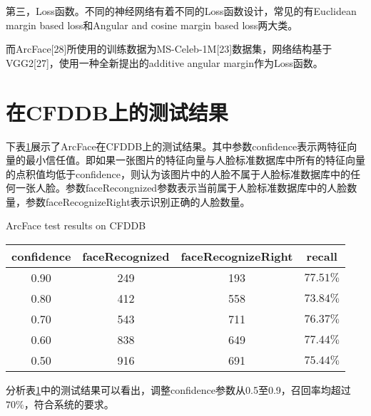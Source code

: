 第三，Loss函数。不同的神经网络有着不同的Loss函数设计，常见的有Euclidean margin based loss和Angular and cosine margin based loss两大类。

而ArcFace[28]所使用的训练数据为MS-Celeb-1M[23]数据集，网络结构基于VGG2[27]，使用一种全新提出的additive angular margin作为Loss函数。

\section{在CFDDB上的测试结果}

下表\ref{tab:arcface}展示了ArcFace在CFDDB上的测试结果。其中参数confidence表示两特征向量的最小信任值。即如果一张图片的特征向量与人脸标准数据库中所有的特征向量的点积值均低于confidence，则认为该图片中的人脸不属于人脸标准数据库中的任何一张人脸。参数faceRecongnized参数表示当前属于人脸标准数据库中的人脸数量，参数faceRecognizeRight表示识别正确的人脸数量。

\begin{table}[!hpb]
	\centering
	{ArcFace test results on CFDDB}
	\label{tab:arcface}
	\begin{tabular}{ ccc | c }
		\hline
		confidence & faceRecognized & faceRecognizeRight &  recall\\
		\hline
		0.90 & 249 & 193 & $77.51\%$\\
		0.80 & 412 & 558 & $73.84\%$\\
		0.70 & 543 & 711 & $76.37\%$\\
		0.60 & 838 & 649 & $77.44\%$\\
		0.50 & 916 & 691 & $75.44\%$\\
		\hline
	\end{tabular}
\end{table}

分析表\ref{tab:arcface}中的测试结果可以看出，调整confidence参数从0.5至0.9，召回率均超过$70\%$，符合系统的要求。